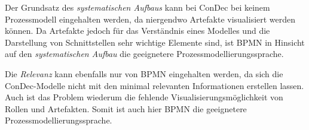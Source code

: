 Der  Grundsatz des \textit{systematischen Aufbaus} kann bei ConDec bei keinem Prozessmodell eingehalten werden, da niergendwo Artefakte visualisiert werden können. Da Artefakte jedoch für das Verständnis eines Modelles und die Darstellung von Schnittstellen sehr wichtige Elemente sind, ist BPMN in Hinsicht auf den \textit{systematischen Aufbau} die geeignetere Prozessmodellierungssprache. \newline


Die \textit{Relevanz} kann ebenfalls nur von BPMN eingehalten werden, da sich die ConDec-Modelle nicht mit den minimal relevanten Informationen erstellen lassen. Auch ist das Problem wiederum die fehlende Visualisierungsmöglichkeit von Rollen und Artefakten. Somit ist auch hier BPMN die geeignetere Prozessmodellierungssprache.\newline

